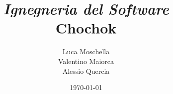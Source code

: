 \title{\emph{Ignegneria del Software}\\ \textbf{{Chochok}}}
\author{Luca Moschella \\ Valentino Maiorca \\ Alessio Quercia}
\date{ \today }
\maketitle